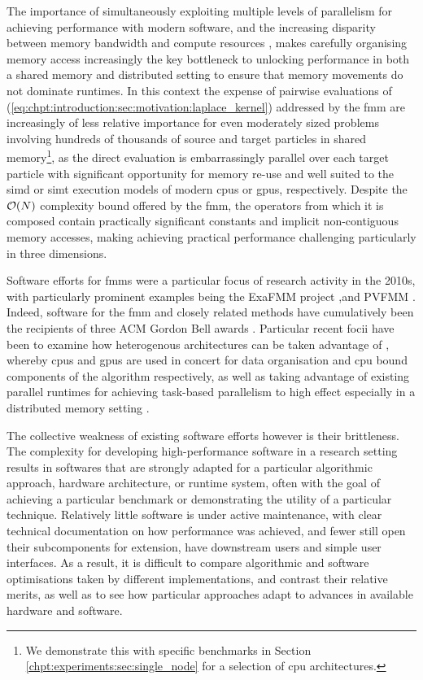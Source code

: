 The importance of simultaneously exploiting multiple levels of parallelism for achieving performance with modern software, and the increasing disparity between memory bandwidth and compute resources \cite{dongarra2017extreme}, makes carefully organising memory access increasingly the key bottleneck to unlocking performance in both a shared memory and distributed setting to ensure that memory movements do not dominate runtimes. In this context the expense of pairwise evaluations of (\ref{eq:chpt:introduction:sec:motivation:laplace_kernel}) addressed by the \acrshort{fmm} are increasingly of less relative importance for even moderately sized problems involving hundreds of thousands of source and target particles in shared memory\footnote{We demonstrate this with specific benchmarks in Section \ref{chpt:experiments:sec:single_node} for a selection of \acrshort{cpu} architectures.}, as the direct evaluation is embarrassingly parallel over each target particle with significant opportunity for memory re-use and well suited to the \acrshort{simd} or \acrshort{simt} execution models of modern \glspl{cpu} or \glspl{gpu}, respectively. Despite the $\mathcal{O}(N)$ complexity bound offered by the \acrshort{fmm}, the operators from which it is composed contain practically significant constants and implicit non-contiguous memory accesses, making achieving practical performance challenging particularly in three dimensions.

Software efforts for \glspl{fmm} were a particular focus of research activity in the 2010s, with particularly prominent examples being the ExaFMM project \cite{barba2011exafmm, wang2021exafmm},and PVFMM \cite{malhotra2015pvfmm}. Indeed, software for the \acrshort{fmm} and closely related methods have cumulatively been the recipients of three ACM Gordon Bell awards \cite{bell2017look}. Particular recent focii have been to examine how heterogenous architectures can be taken advantage of \cite{malhotra2015pvfmm}, whereby \glspl{cpu} and \glspl{gpu} are used in concert for data organisation and \acrshort{cpu} bound components of the algorithm respectively, as well as taking advantage of existing parallel runtimes for achieving task-based parallelism to high effect especially in a distributed memory setting \cite{bramas2020tbfmm, agullo2014task}.

The collective weakness of existing software efforts however is their brittleness. The complexity for developing high-performance software in a research setting results in softwares that are strongly adapted for a particular algorithmic approach, hardware architecture, or runtime system, often with the goal of achieving a particular benchmark or demonstrating the utility of a particular technique. Relatively little software is under active maintenance, with clear technical documentation on how performance was achieved, and fewer still open their subcomponents for extension, have downstream users and simple user interfaces. As a result, it is difficult to compare algorithmic and software optimisations taken by different implementations, and contrast their relative merits, as well as to see how particular approaches adapt to advances in available hardware and software.

